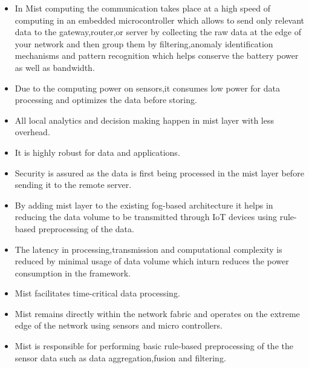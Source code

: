 \begin{itemize}
	\item In Mist computing the communication takes place at a high speed of computing in an embedded microcontroller which allows to send only relevant data to the gateway,router,or server by collecting the raw data at the edge of your network and then group them by filtering,anomaly identification mechanisms and pattern recognition which helps conserve the battery power as well as bandwidth\cite{1}.\\
	\item Due to the computing power on sensors,it consumes low power for data processing and optimizes the data before storing.\\
	\item All local analytics and decision making happen in mist layer with less overhead.\\
	\item It is highly robust for data and applications.\\
	\item Security is assured as the data is first being processed in the mist layer before sending it to the remote server.\\
	\item By adding mist layer to the existing fog-based architecture it helps in reducing the data volume to be transmitted through IoT devices using rule-based preprocessing of the data\cite{3}.\\
	\item The latency in processing,transmission and computational complexity is reduced by minimal usage of data volume which inturn reduces the power consumption in the framework.\\
	\item Mist facilitates time-critical data processing.\\
	\item Mist remains directly within the network fabric and operates on the extreme edge of the network using sensors and micro controllers\cite{3}.\\
	\item Mist is responsible for performing basic rule-based preprocessing of the the sensor data such as data aggregation,fusion and filtering\cite{3}.\\
\end{itemize}
\newpage
